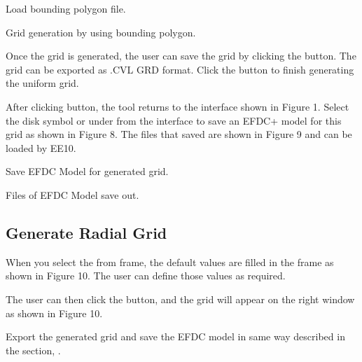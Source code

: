 \documentclass[letterpaper,10pt,english]{sphinxmanual}
\begin{document}
 Load bounding polygon file.


 Grid generation by using bounding polygon.

Once the grid is generated, the user can save the grid by clicking the
 button. The grid can be exported as \sphinxstyleemphasis{*}.CVL GRD
format. Click the  button to finish generating the uniform grid.

After clicking  button, the tool returns to the interface shown in
Figure 1. Select the disk symbol or  under  from the
interface to save an EFDC+ model for this grid as shown in Figure 8. The
files that saved are shown in Figure 9 and can be loaded by EE10.


 Save EFDC Model for generated grid.


 Files of EFDC Model save out.


\subsection{Generate Radial Grid}
\label{\detokenize{gridgen/radialgrid:generate-radial-grid}}\label{\detokenize{gridgen/radialgrid:radialgrid}}\label{\detokenize{gridgen/radialgrid::doc}}
When you select the  from  frame, the
default values are filled in the  frame as shown in
Figure 10. The user can define those values as required.

The user can then click the  button, and the grid will appear
on the right window as shown in Figure 10.

Export the generated grid and save the EFDC model in same way described
in the section, {\hyperref[\detokenize{gridgen/uniformgrid:uniformgrid}]{}}.

\end{document}
